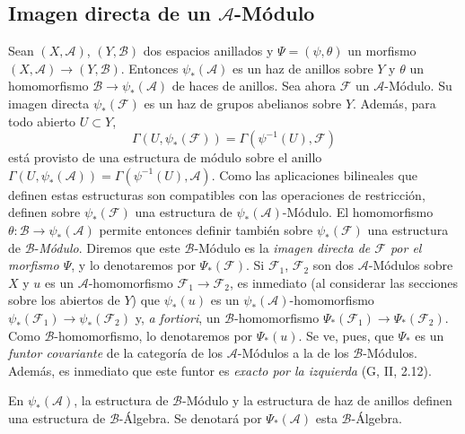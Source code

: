 \subsection{Imagen directa de un $\mathcal{A}$-Módulo}
\label{subsection:0.4.2-fr}

\begin{env}[4.2.1]
\label{0.4.2.1-fr}
Sean $(X,\mathcal{A})$, $(Y,\mathcal{B})$ dos espacios anillados y
$\Psi=(\psi,\theta)$ un morfismo
$(X,\mathcal{A})\to(Y,\mathcal{B})$. Entonces $\psi_*(\mathcal{A})$ es un
haz de anillos sobre $Y$ y $\theta$ un homomorfismo
$\mathcal{B}\to\psi_*(\mathcal{A})$ de haces de anillos. Sea ahora
$\mathcal{F}$ un $\mathcal{A}$-Módulo. Su imagen directa
$\psi_*(\mathcal{F})$ es un haz de grupos abelianos sobre $Y$. Además,
para todo abierto $U\subset Y$,
\[
  \Gamma(U,\psi_*(\mathcal{F}))
  =\Gamma(\psi^{-1}(U),\mathcal{F})
\]
está provisto de una estructura de módulo sobre el anillo
$\Gamma(U,\psi_*(\mathcal{A}))=\Gamma(\psi^{-1}(U),\mathcal{A})$.
Como las aplicaciones bilineales que definen estas estructuras son
compatibles con las operaciones de restricción, definen sobre
$\psi_*(\mathcal{F})$ una estructura de $\psi_*(\mathcal{A})$-Módulo.
El homomorfismo $\theta:\mathcal{B}\to\psi_*(\mathcal{A})$ permite entonces
definir también sobre $\psi_*(\mathcal{F})$ una estructura de
$\mathcal{B}$-\emph{Módulo}. Diremos que este $\mathcal{B}$-Módulo es la
\emph{imagen directa de $\mathcal{F}$ por el morfismo $\Psi$}, y lo
denotaremos por $\Psi_*(\mathcal{F})$. Si $\mathcal{F}_1$, $\mathcal{F}_2$
son dos $\mathcal{A}$-Módulos sobre $X$ y $u$ es un
$\mathcal{A}$-homomorfismo $\mathcal{F}_1\to\mathcal{F}_2$, es inmediato
(al considerar las secciones sobre los abiertos de $Y$) que $\psi_*(u)$
es un $\psi_*(\mathcal{A})$-homomorfismo
$\psi_*(\mathcal{F}_1)\to\psi_*(\mathcal{F}_2)$ y, \emph{a fortiori}, un
$\mathcal{B}$-homomorfismo
$\Psi_*(\mathcal{F}_1)\to\Psi_*(\mathcal{F}_2)$. Como
$\mathcal{B}$-homomorfismo, lo denotaremos por $\Psi_*(u)$. Se ve, pues, que
$\Psi_*$ es un \emph{funtor covariante} de la categoría de los
$\mathcal{A}$-Módulos a la de los $\mathcal{B}$-Módulos. Además, es
inmediato que este funtor es \emph{exacto por la izquierda} (G, II, 2.12).

En $\psi_*(\mathcal{A})$, la estructura de $\mathcal{B}$-Módulo y la
estructura de haz de anillos definen una estructura de
$\mathcal{B}$-Álgebra. Se denotará por $\Psi_*(\mathcal{A})$ esta
$\mathcal{B}$-Álgebra.
\end{env}

